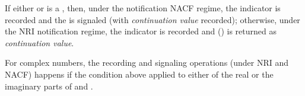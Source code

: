 \documentclass[../Comparisons-Predicates.tex]{subfiles}
\begin{document}
  \DExceptional{}
  
  If either  or  is a , then, under the notification NACF regime, the indicator
   is recorded and the
   is signaled (with
  \emph{continuation value}  recorded); otherwise, under the
  NRI notification regime, the indicator  is recorded and
   () is returned as \emph{continuation value}.
  
  For complex numbers, the recording and signaling operations (under NRI
  and NACF) happens if the condition above applied to either of the real
  or the imaginary parts of  and .
  
\end{document}
